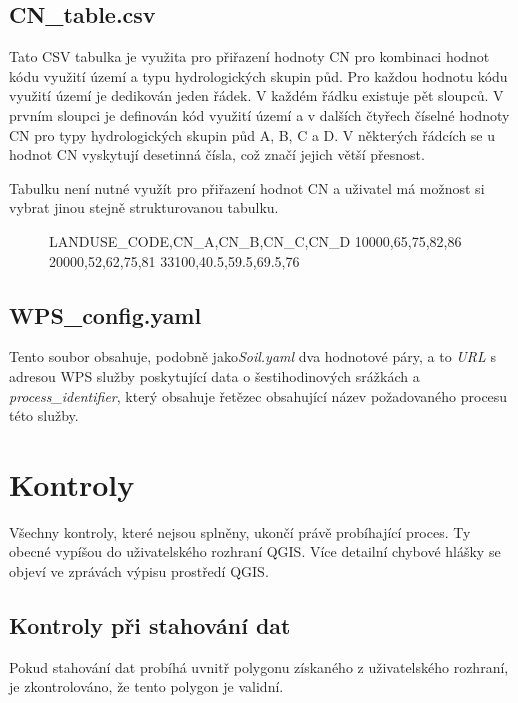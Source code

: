 \documentclass[a4paper,oneside,12pt]{book}
\begin{document}
\subsection{CN\_table.csv} \label{CN_table.csv}
\hspace{10mm} Tato CSV tabulka je využita pro přiřazení hodnoty CN pro kombinaci hodnot kódu využití území a typu hydrologických skupin půd. Pro každou hodnotu kódu využití území je dedikován jeden řádek. V každém řádku existuje pět sloupců. V prvním sloupci je definován kód využití území a v dalších čtyřech číselné hodnoty CN pro typy hydrologických skupin půd A, B, C a D. V některých řádcích se u hodnot CN vyskytují desetinná čísla, což značí jejich větší přesnost.

\hspace{10mm} Tabulku není nutné využít pro přiřazení hodnot CN a uživatel má možnost si vybrat jinou stejně strukturovanou tabulku.

\begin{figure}[H]
\begin{pythoncode}[style=mypython, caption={Ukázka CN\_table.csv},label={kod:CN_table.csv}]
LANDUSE_CODE,CN_A,CN_B,CN_C,CN_D
10000,65,75,82,86
20000,52,62,75,81
33100,40.5,59.5,69.5,76
\end{pythoncode}
\end{figure}

\subsection{WPS\_config.yaml} \label{WPS_config.yaml}
\hspace{10mm} Tento soubor obsahuje, podobně jako\textit{Soil.yaml} dva hodnotové páry, a to \textit{URL} s adresou WPS služby poskytující data o šestihodinových srážkách a \textit{process\_identifier}, který obsahuje řetězec obsahující název požadovaného procesu této služby.

\section{Kontroly} \label{checks}
\hspace{10mm} Všechny kontroly, které nejsou splněny, ukončí právě probíhající proces. Ty obecné vypíšou do uživatelského rozhraní QGIS. Více detailní chybové hlášky se objeví ve zprávách výpisu prostředí QGIS.

\subsection{Kontroly při stahování dat} \label{download_checks}
\hspace{10mm} Pokud stahování dat probíhá uvnitř polygonu získaného z uživatelského rozhraní, je zkontrolováno, že tento polygon je validní.
\end{document}
